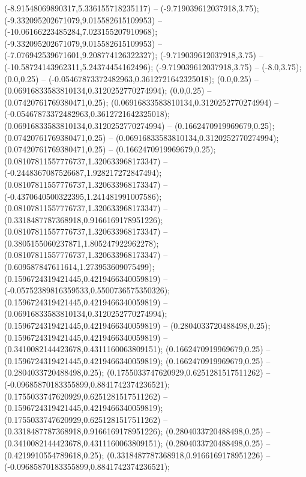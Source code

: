  (-8.91548069890317,5.336155718235117) -- (-9.719039612037918,3.75);
 (-9.332095202671079,9.015582615109953) -- (-10.06166223485284,7.023155207910968);
 (-9.332095202671079,9.015582615109953) -- (-7.076942539671601,9.208774126322327);
 (-9.719039612037918,3.75) -- (-10.58724143962311,5.24374454162496);
 (-9.719039612037918,3.75) -- (-8.0,3.75);
 (0.0,0.25) -- (-0.05467873372482963,0.3612721642325018);
 (0.0,0.25) -- (0.06916833583810134,0.3120252770274994);
 (0.0,0.25) -- (0.07420761769380471,0.25);
 (0.06916833583810134,0.3120252770274994) -- (-0.05467873372482963,0.3612721642325018);
 (0.06916833583810134,0.3120252770274994) -- (0.1662470919969679,0.25);
 (0.07420761769380471,0.25) -- (0.06916833583810134,0.3120252770274994);
 (0.07420761769380471,0.25) -- (0.1662470919969679,0.25);
 (0.08107811557776737,1.320633968173347) -- (-0.2448367087526687,1.928217272847494);
 (0.08107811557776737,1.320633968173347) -- (-0.4370640500322395,1.241481991007586);
 (0.08107811557776737,1.320633968173347) -- (0.3318487787368918,0.9166169178951226);
 (0.08107811557776737,1.320633968173347) -- (0.3805155060237871,1.805247922962278);
 (0.08107811557776737,1.320633968173347) -- (0.609587847611614,1.273953609075499);
 (0.1596724319421445,0.4219466340059819) -- (-0.05752389816359533,0.5500736575350326);
 (0.1596724319421445,0.4219466340059819) -- (0.06916833583810134,0.3120252770274994);
 (0.1596724319421445,0.4219466340059819) -- (0.2804033720488498,0.25);
 (0.1596724319421445,0.4219466340059819) -- (0.3410082144423678,0.4311160063809151);
 (0.1662470919969679,0.25) -- (0.1596724319421445,0.4219466340059819);
 (0.1662470919969679,0.25) -- (0.2804033720488498,0.25);
 (0.1755033747620929,0.6251281517511262) -- (-0.09685870183355899,0.8841742374236521);
 (0.1755033747620929,0.6251281517511262) -- (0.1596724319421445,0.4219466340059819);
 (0.1755033747620929,0.6251281517511262) -- (0.3318487787368918,0.9166169178951226);
 (0.2804033720488498,0.25) -- (0.3410082144423678,0.4311160063809151);
 (0.2804033720488498,0.25) -- (0.4219910554789618,0.25);
 (0.3318487787368918,0.9166169178951226) -- (-0.09685870183355899,0.8841742374236521);
